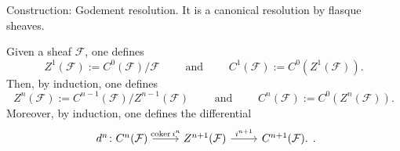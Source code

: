 \documentclass[../Main]{subfiles}
\begin{document}
Construction: Godement resolution.
It is a canonical resolution by flasque sheaves.
\begin{defn}[]
	Given a sheaf $\mathcal{F}$, one defines 
	\begin{equation}
		Z^1(\mathcal{F}) := C^0(\mathcal{F})/\mathcal{F}
		\qquad \text{ and } \qquad
		C^1(\mathcal{F}) := C^0( Z^1 (\mathcal{F} ))
	.\end{equation} 
	Then, by induction, one defines
	\begin{equation}
		Z^n(\mathcal{F}) := C^{n-1}(\mathcal{F})/Z^{n-1}(\mathcal{F})
		\qquad \text{ and } \qquad
		C^n(\mathcal{F}) := C^0( Z^n (\mathcal{F} ))
	.\end{equation} 
	Moreover, by induction, one defines the differential
	\begin{equation}
	\begin{tikzcd}
		d^n\colon C^n(\mathcal{F}) \arrow[r, "\coker i^n", rightarrow] &
		Z^{n+1}(\mathcal{F}) \arrow[r, "i^{n+1}", rightarrow] &
		C^{n+1}(\mathcal{F}).
	\end{tikzcd}
	.\end{equation} 
\end{defn}
\end{document}

